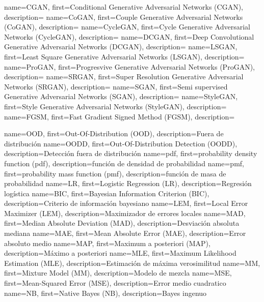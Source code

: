      {name={CGAN},       first={Conditional Generative Adversarial Networks (CGAN)},         description={}}
    {name={CoGAN},      first={Couple Generative Adversarial Networks (CoGAN)},             description={}}
 {name={CycleGAN},   first={Cycle Generative Adversarial Networks (CycleGAN)},           description={}}
    {name={DCGAN},      first={Deep Convolutional Generative Adversarial Networks (DCGAN)}, description={}}
    {name={LSGAN},      first={Least Square Generative Adversarial Networks (LSGAN)},       description={}}
   {name={ProGAN},     first={Progresvive Generative Adversarial Networks (ProGAN)},       description={}}
    {name={SRGAN},      first={Super Resolution Generative Adversarial Networks (SRGAN)},   description={}}
     {name={SGAN},       first={Semi supervised Generative Adversarial Networks (SGAN)},     description={}}
 {name={StyleGAN},   first={Style Generative Adversarial Networks (StyleGAN)},           description={}}
% 
 {name={FGSM},   first={Fast Gradient Signed Method (FGSM)},           description={}}


  {name={OOD},        first={Out-Of-Distribution (OOD)},                  description={Fuera de distribución}}
 {name={OODD},       first={Out-Of-Distribution Detection (OODD)},       description={Detección fuera de distribución}}
  {name={pdf},        first={probability density function (pdf)},         description={función de densidad de probabilidad}}
  {name={pmf},        first={probability mass function (pmf)},            description={función de masa de probabilidad}}
   {name={LR},         first={Logistic Regression (LR)},                   description={Regresión logística}}
  {name={BIC},        first={Bayesian Information Criterion (BIC)},       description={Criterio de información bayesiano}}
  {name={LEM},        first={Local Error Maximizer (LEM)},                description={Maximizador de errores locales}}
  {name={MAD},        first={Median Absolute Deviation (MAD)},            description={Desviación absoluta mediana}}
  {name={MAE},        first={Mean Absolute Error (MAE)},                  description={Error absoluto medio}}
  {name={MAP},        first={Maximum a posteriori (MAP)},                 description={Máximo a posteriori}}
  {name={MLE},        first={Maximum Likelihood Estimation (MLE)},        description={Estimación de máxima verosimilitud}}
   {name={MM},         first={Mixture Model (MM)},                         description={Modelo de mezcla}}
  {name={MSE},        first={Mean-Squared Error (MSE)},                   description={Error medio cuadratico}}
   {name={NB},         first={Native Bayes (NB)},                          description={Bayes ingenuo}}


